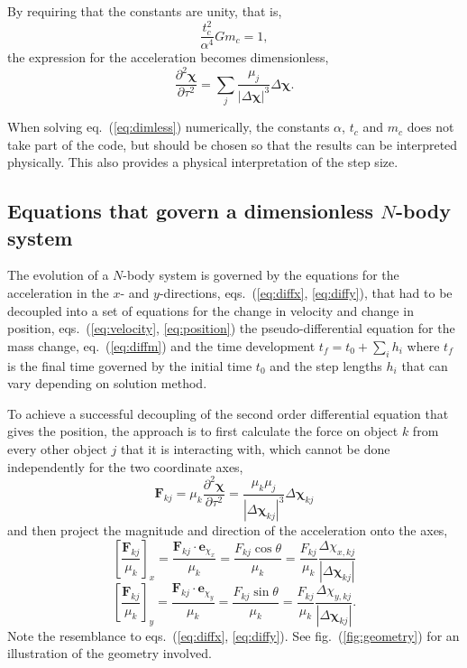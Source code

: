 \documentclass[a4paper,11pt]{article}
\begin{document}
\begin{itemize}
By requiring that the constants are unity, that is,
\[    \frac{t_c^2}{\alpha^4} G m_c = 1, \]
the expression for the acceleration becomes dimensionless,
\begin{equation}
\frac{\partial^2 \boldsymbol{\chi}}{\partial \tau^2} = \sum_j \frac{\mu_j}{|\Delta \boldsymbol{\chi}|^3} \Delta \boldsymbol{\chi}.
    \label{eq:dimless}
\end{equation}
\end{itemize}

When solving eq.~(\ref{eq:dimless}) numerically, the constants $\alpha$, $t_c$ and $m_c$ does not take part of the code, but should be chosen so that the results can be interpreted physically. This also provides a physical interpretation of the step size.

\subsection{Equations that govern a dimensionless $N$-body system}
The evolution of a $N$-body system is governed by the equations for the acceleration in the $x$- and $y$-directions, eqs.~(\ref{eq:diffx}, \ref{eq:diffy}), that had to be decoupled into a set of equations for the change in velocity and change in position, eqs.~(\ref{eq:velocity}, \ref{eq:position}) the pseudo-differential equation for the mass change, eq.~(\ref{eq:diffm}) and the time development $t_f = t_0 + \sum_i h_i$ where $t_f$ is the final time governed by the initial time $t_0$ and the step lengths $h_i$ that can vary depending on solution method.

To achieve a successful decoupling of the second order differential equation that gives the position, the approach is to first calculate the force on object $k$ from every other object $j$ that it is interacting with, which cannot be done independently for the two coordinate axes, 
\[ \mathbf{F}_{kj} = \mu_k \frac{\partial^2 \boldsymbol{\chi}}{\partial \tau^2} = \frac{\mu_k \mu_j}{|\Delta \boldsymbol{\chi}_{kj}|^3} \Delta \boldsymbol{\chi}_{kj} \]
and then project the magnitude and direction of the acceleration onto the axes,
\[ \left[ \frac{\mathbf{F}_{kj}}{\mu_k} \right]_x = \frac{\mathbf{F}_{kj} \cdot \mathbf{e}_{\chi_x}}{\mu_k} = \frac{F_{kj} \cos \theta}{\mu_k} = \frac{F_{kj}}{\mu_k} \frac{\Delta \chi_{x,kj}}{|\Delta \boldsymbol{\chi}_{kj}|}  \]
\[ \left[ \frac{\mathbf{F}_{kj}}{\mu_k} \right]_y =  \frac{\mathbf{F}_{kj} \cdot \mathbf{e}_{\chi_y}}{\mu_k} = \frac{F_{kj} \sin \theta}{\mu_k} = \frac{F_{kj}}{\mu_k} \frac{\Delta \chi_{y,kj}}{|\Delta \boldsymbol{\chi}_{kj}|}.  \]
Note the resemblance to eqs.~(\ref{eq:diffx}, \ref{eq:diffy}). See fig.~(\ref{fig:geometry}) for an illustration of the geometry involved.
\end{document}
